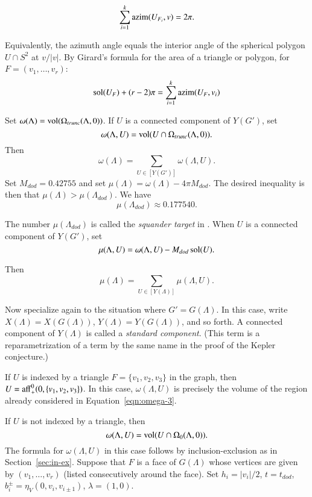 \documentclass{article} %
\begin{document}
$$
\sum_{i=1}^k {\operatorname{azim}}(U_{F_i},v) = 2\pi.
$$

Equivalently, the azimuth angle equals the interior angle of the
spherical polygon $U\cap S^2$ at $v/|v|$. By Girard's formula for the
area of a triangle or polygon, for 
$F = (v_1,\ldots,v_r)$:
  $$
  \operatorname{sol}(U_F) + (r-2)\pi = \sum_{i=1}^k {\operatorname{azim}}(U_F,v_i)
  $$


Set $\omega(\Lambda)={\operatorname{vol}}(\Omega_{trunc}(\Lambda,0))$.
If $U$ is a connected component of $Y(G')$, set
  $$\omega(\Lambda,U) = {\operatorname{vol}}(U\cap \Omega_{trunc}(\Lambda,0)).$$
Then
\begin{equation}\label{eqn:omegaU}
  \omega(\Lambda) = 
  \sum_{U\in[Y(G')]} \omega(\Lambda,U).
\end{equation}
Set $M_{dod}=0.42755$ and set  $\mu(\Lambda)= \omega(\Lambda)- 4\pi M_{dod}$.
The desired inequality is then
that $\mu(\Lambda) > \mu(\Lambda_{dod})$.  
We have 
$$
  \mu(\Lambda_{dod}) \approx 0.177540.
$$


The number $\mu(\Lambda_{dod})$ is called the \emph{squander target}
in \cite{Hales:2002:Dodec}. When $U$ is a connected component of
$Y(G')$, set
\begin{equation}\label{eqn:mU}
  \mu(\Lambda,U)= \omega(\Lambda,U) - M_{dod} \operatorname{sol}(U).
\end{equation}

Then
$$
\mu(\Lambda) = \sum_{U\in[Y(\Lambda)]} \mu(\Lambda,U).
$$

Now specialize again to the situation where $G'=G(\Lambda)$. In this
case, write $X(\Lambda)=X(G(\Lambda))$, $Y(\Lambda)=Y(G(\Lambda))$,
and so forth. A connected component of $Y(\Lambda)$ is called a
\emph{standard component}. (This term is a reparametrization of a term
by the same name in the proof of the Kepler conjecture.)

If $U$ is indexed by a triangle $F=\{v_1,v_2,v_3\}$ in the graph,
then $U = {\operatorname{aff}}_+^0(0,\{v_1,v_2,v_3\})$.  In this case,
$\omega(\Lambda,U)$ is precisely the volume of the region
already considered in Equation~\ref{eqn:omega-3}.

If $U$ is not indexed by a triangle, then
$$\omega(\Lambda,U) = {\operatorname{vol}}(U\cap\Omega_0(\Lambda,0)).$$
The formula for $\omega(\Lambda,U)$ in this case follows
by inclusion-exclusion as in Section~\ref{sec:in-ex}.  Suppose
that $F$ is a face of $G(\Lambda)$ whose vertices are given
by $(v_1,\ldots,v_r)$ (listed consecutively around the face).
Set $h_i=|v_i|/2$, $t=t_{dod}$, $b^\pm_{i}=\eta_V(0,v_i,v_{i\pm 1})$,
$\lambda=(1,0)$.
\end{document}
